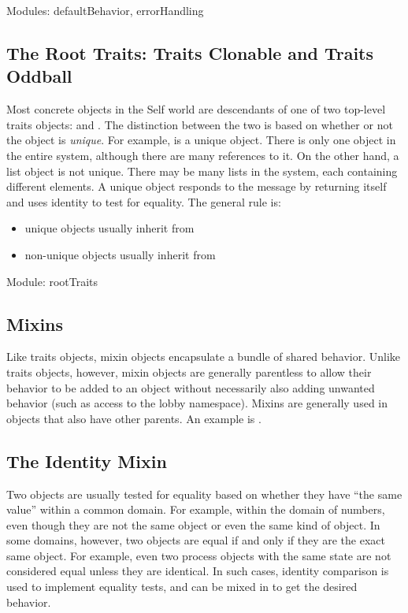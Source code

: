 \documentclass[letterpaper,10pt,english]{sphinxmanual}
\begin{document}
Modules: defaultBehavior, errorHandling


\subsection{The Root Traits: Traits Clonable and Traits Oddball}
\label{roots:the-root-traits-traits-clonable-and-traits-oddball}
Most concrete objects in the Self world are descendants of one of two top-level traits objects:
 and . The distinction between the two is based on whether
or not the object is \emph{unique}. For example,  is a unique object. There is only one  object in
the entire system, although there are many references to it. On the other hand, a list object is not
unique. There may be many lists in the system, each containing different elements. A unique object
responds to the message  by returning itself and uses identity to test for equality. The general
rule is:
\begin{itemize}
\item {} 
unique objects usually inherit from 

\item {} 
non-unique objects usually inherit from 

\end{itemize}

Module: rootTraits


\subsection{Mixins}
\label{roots:mixins}
Like traits objects, mixin objects encapsulate a bundle of shared behavior. Unlike traits objects,
however, mixin objects are generally parentless to allow their behavior to be added to an object
without necessarily also adding unwanted behavior (such as access to the lobby namespace). Mixins
are generally used in objects that also have other parents. An example is .


\subsection{The Identity Mixin}
\label{roots:the-identity-mixin}
Two objects are usually tested for equality based on whether they have “the same value” within a
common domain. For example,  within the domain of numbers, even though they are not
the same object or even the same kind of object. In some domains, however, two objects are equal
if and only if they are the exact same object. For example, even two process objects with the same
state are not considered equal unless they are identical. In such cases, identity comparison is used
to implement equality tests, and  can be mixed in to get the desired behavior.
\end{document}
